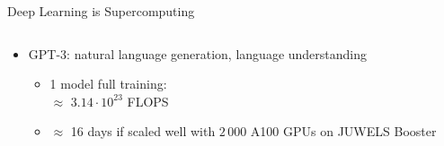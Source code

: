 \begin{frame}{Deep Learning is Supercomputing}
\protect\hypertarget{deep-learning-is-supercomputing-7}{}
\begin{columns}[T]
\begin{column}{0.4\textwidth}
\begin{itemize}
\tightlist
\item
  GPT-3: natural language generation, language understanding

  \begin{itemize}
  \tightlist
  \item
    1 model full training:\\
    \(\approx\) \(3.14\cdot 10^{23}\) FLOPS
  \item
    \(\approx\) 16 days if scaled well with \(2\,000\) A100 GPUs on
    JUWELS Booster
  \end{itemize}
\end{itemize}
\end{column}

\begin{column}{0.6\textwidth}
\vspace*{2cm}
\end{column}
\end{columns}
\end{frame}

